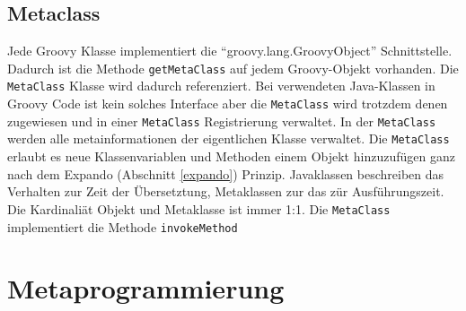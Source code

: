 \documentclass[11pt,english,ngerman, headsepline]{scrreprt}
\begin{document}
 \subsection{Metaclass}
 
Jede Groovy Klasse implementiert die ``groovy.lang.GroovyObject''
 Schnittstelle.
Dadurch ist die Methode \texttt{getMetaClass} auf jedem Groovy-Objekt
vorhanden.
Die \texttt{MetaClass} Klasse wird dadurch referenziert.
Bei verwendeten Java-Klassen in Groovy Code ist kein solches Interface aber die
\texttt{MetaClass} wird trotzdem denen zugewiesen und in einer
\texttt{MetaClass} Registrierung \cite{fowler2003patterns}
verwaltet.
In der \texttt{MetaClass} werden alle metainformationen der eigentlichen Klasse
verwaltet. Die \texttt{MetaClass} erlaubt es neue Klassenvariablen und Methoden einem
Objekt hinzuzufügen ganz nach dem Expando (Abschnitt \ref{expando}) Prinzip.
Javaklassen beschreiben das Verhalten zur Zeit der Übersetztung, Metaklassen zur
das zür Ausführungszeit.
Die Kardinaliät Objekt und Metaklasse ist immer 1:1.
Die \texttt{MetaClass} implementiert die Methode \texttt{invokeMethod}















\section{Metaprogrammierung}\label{metaprogrammingLabel}

 

\end{document}
